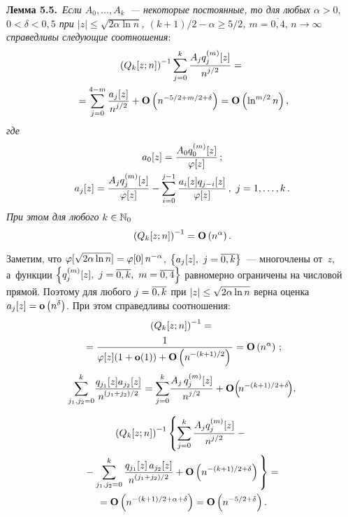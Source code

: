 \begin{multicols}{2}
\noindent
\textbf{Лемма 5.5.}\
\textit{Если $A_0,\ldots,A_k$~--- некоторые постоянные, то
  для любых  $\alpha>0,$ $0<\delta<0{,}5$ при $|z|\le \sqrt{2\alpha\ln n}$,
$(k+1)/2-\alpha\geq 5/2$, $m=\overline{0,4},\,n\rightarrow \infty$
справедливы следующие соотношения}:
 \begin{multline*}
 \left(Q_k[z;n]\right)^{-1}
 \sum\limits_{j=0}^k \displaystyle\frac{\displaystyle A_j q_j^{(m)}[z]\mathstrut}{\displaystyle n^{j/2}\mathstrut} ={}\\
 {}=
 \sum\limits_{j=0}^{4-m} \displaystyle\frac{\displaystyle a_j[z]\mathstrut}{\displaystyle n^{j/2}\mathstrut}
 +\mathbf{O}\left(n^{-5/2+m/2+\delta}\right)=
\mathbf{O}\left(\ln^{m/2} n\right),
 \end{multline*}
\textit{где}
 \begin{gather*}
 a_0[z]=\displaystyle\frac{\displaystyle A_0 q_0^{(m)}[z]\mathstrut}{\displaystyle \varphi[z]\mathstrut}\,;\\
 a_j[z]=\displaystyle\frac{\displaystyle A_j q_j^{(m)}[z]\mathstrut}{\displaystyle \varphi[z]\mathstrut}
-\sum\limits_{i=0}^{j-1} \displaystyle\frac{\displaystyle a_i[z] q_{j-i}[z]\mathstrut}{\displaystyle \varphi[z]\mathstrut}\,,\
j=1,\ldots,k\,.
 \end{gather*}
 \textit{При этом для любого} $k\hm\in \mathbb{N}_0$
  \begin{equation}
  \left(Q_k[z;n]\right)^{-1}= \mathbf{O}\left(n^{\alpha}\right).
 \label{L:5.5-2}
 \end{equation}


\smallskip

 \Do
 Заметим,
 что $\varphi[\sqrt{2\alpha\ln n}]\hm=\varphi[0]\,n^{-\alpha}$,
 $\left\{a_j[z],\ j\hm=\overline{0,k}\right\}$~--- многочлены от~$z$,
 а~функции $\left\{q_j^{(m)}[z],\ j\hm=\overline{0,k},\ m\hm=\overline{0,4}\right\}$ равномерно ограничены на числовой прямой.
 Поэтому для любого $j\hm=\overline{0,k}$ при $|z|\hm\le \sqrt{2\alpha\ln n}$
 верна оценка $a_j[z]\hm=\op\left(n^{\delta}\right)$.
    При этом справедливы соотношения:
 \begin{multline*}
  \left(Q_k[z;n]\right)^{-1}={}\\
  {}=
 \displaystyle\frac{\displaystyle 1\mathstrut}{\displaystyle \varphi[z](1+\mathbf{o}(1)) +\mathbf{O}\left(n^{-(k+1)/2}\right)\mathstrut}=
 \mathbf{O}\left(n^\alpha\right)\,;
\end{multline*}
\begin{equation*}
 \sum\limits_{j_1,j_2=0}^{k}\! \displaystyle\frac{\displaystyle q_{j_1}[z] a_{j_2}[z]\mathstrut}{\displaystyle n^{(j_1+j_2)/2}\mathstrut}
 = \sum\limits_{j=0}^k \! \displaystyle\frac{\displaystyle A_{j}\,q_{j}^{(m)}[z]\mathstrut}{\displaystyle n^{j/2}\mathstrut}+
 \mathbf{O}\!\left(\!n^{-(k+1)/2+\delta}\!\right)\!,
 \end{equation*}

 \vspace*{-12pt}

 \noindent
 \begin{multline*}
 \left(Q_k[z;n]\right)^{-1}\left\{\sum\limits_{j=0}^k \fr{A_j q_j^{(m)}[z]}{n^{j/2}}-{}\right.\\
\left. {}-
 \sum\limits_{j_1,j_2=0}^{k} \fr{q_{j_1}[z]\,a_{j_2}[z]}{n^{(j_1+j_2)/2}}
 + \Op\left(n^{-(k+1)/2+\delta}\right)
\vphantom{\sum\limits_{j=0}^k}
\right\} ={}
\\
 {} =\Op\left(n^{-(k+1)/2+\alpha+\delta}\right)=
  \Op\left(n^{-5/2+\delta}\right).
 \end{multline*}


\end{multicols}

